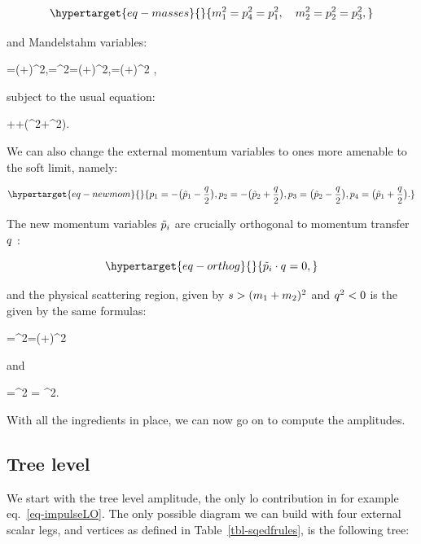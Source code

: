 \documentclass[
  11pt,
  a4paper,
  DIV=11,
  numbers=noendperiod,
  oneside]{scrreprt}
\let\[\relax \let\]\relax %
\DeclareRobustCommand{\[}{\begin{equation}}
\DeclareRobustCommand{\]}{\end{equation}}
\begin{document}
\begin{equation}\protect\hypertarget{eq-masses}{}{
 \mass[1]^2=\emom[4]^2 =\emom[1]^2,\quad \mass[2]^2=\emom[2]^2 =\emom[3]^2,
}\label{eq-masses}\end{equation}

and Mandelstahm variables:

\[
 \mands=(\emom[1]+\emom[2])^2,\quad \mandt=\tm^2=(\emom[1]+\emom[4])^2,\quad \mandu=(\emom[1]+\emom[3])^2   ,
\]

subject to the usual equation:

\[
\mands+\mandt+(\mass[1]^2+\mass[2]^2).
\]

We can also change the external momentum variables to ones more amenable
to the soft limit, namely:

\begin{equation}\protect\hypertarget{eq-newmom}{}{
\emom[1]=-\pa[\big]{\semom[1]-\Half[\tm]}, \emom[2]=-\pa[\big]{\semom[2]+\Half[\tm]}, \emom[3]=\pa[\big]{\semom[2]-\Half[\tm]}, \emom[4]=\pa[\big]{\semom[1]+\Half[\tm]} .
}\label{eq-newmom}\end{equation}

The new momentum variables \(\semom[i]\) are crucially orthogonal to
momentum transfer \(\tm\) :

\begin{equation}\protect\hypertarget{eq-orthog}{}{
\semom[i]\cdot\tm=0,
}\label{eq-orthog}\end{equation}

and the physical scattering region, given by
\(\mands>(\mass[1]+\mass[2])^2\) and \(\tm^2<0\) is the given by the
same formulas:

\[
\mands=\pa[\Big]{-\pa[\big]{\semom[1]-\Half[\tm]}-\pa[\big]{\semom[2]+\Half[\tm]}}^2=(\semom[1]+\semom[2])^2
\]

and

\[
\mandt=\pa[\Big]{-\pa[\big]{\semom[1]-\Half[\tm]}+\semom[1]+\Half[\tm]}^2 = \tm^2.
\]

With all the ingredients in place, we can now go on to compute the
amplitudes.

\hypertarget{tree-level}{%
\subsection{Tree level}\label{tree-level}}

We start with the tree level amplitude, the only \gls{lo} contribution
in for example eq.~\ref{eq-impulseLO}. The only possible diagram we can
build with four external scalar legs, and vertices as defined in
Table~\ref{tbl-sqedfrules}, is the following tree:
\end{document}
